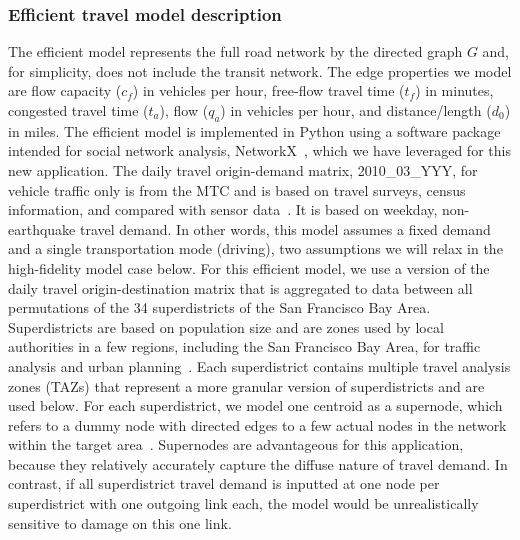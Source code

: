 \subsubsection{Efficient travel model description}
The efficient model represents the full road network by the directed graph $G$ and, for simplicity, does not include the transit network. The edge properties we model are flow capacity ($c_f$) in vehicles per hour, free-flow travel time ($t_f$) in minutes, congested travel time ($t_a$), flow  ($q_a$) in vehicles per hour, and distance/length ($d_0$) in miles. The efficient model is implemented in Python using a software package intended for social network analysis, NetworkX~\cite{hagberg_exploring_2008}, which we have leveraged for this new application. The daily travel origin-demand matrix, 2010\_03\_YYY, for vehicle traffic only is from the MTC and is based on travel surveys, census information, and compared with sensor data~\cite{erhardt_mtcs_2012,ory_initial_2012}. It is based on weekday, non-earthquake travel demand. In other words, this model assumes a fixed demand and a single transportation mode (driving), two assumptions we will relax in the high-fidelity model case below. For this efficient model, we use a version of the daily travel origin-destination matrix that is aggregated to data between all permutations of the 34 superdistricts of the San Francisco Bay Area. Superdistricts are based on population size and are zones used by local authorities in a few regions, including the San Francisco Bay Area, for traffic analysis and urban planning~\cite{national_cooperative_highway_research_program_nchrp_predicting_2005}. Each superdistrict contains multiple travel analysis zones (TAZs) that represent a more granular version of superdistricts and are used below. For each superdistrict, we model one centroid as a supernode, which refers to a dummy node with directed edges to a few actual nodes in the network within the target area~\cite{lim_seismic_2014}. 
Supernodes are advantageous for this application, because they relatively accurately capture the diffuse nature of travel demand. In contrast, if all superdistrict travel demand is inputted at one node per superdistrict with one outgoing link each, the model would be unrealistically sensitive to damage on this one link.
